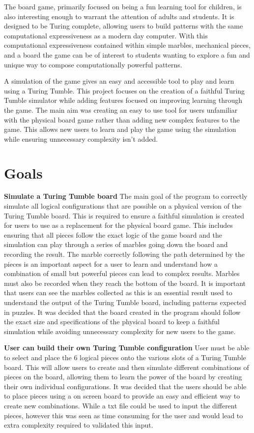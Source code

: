\documentclass{l4proj}
\begin{document}
The board game, primarily focused on being a fun learning tool for children, is also interesting enough to warrant the attention of adults and students. It is designed to be Turing complete, allowing users to build patterns with the same computational expressiveness as a modern day computer. With this computational expressiveness contained within simple marbles, mechanical pieces, and a board the game can be of interest to students wanting to explore a fun and unique way to compose computationally powerful patterns.  

A simulation of the game gives an easy and accessible tool to play and learn using a Turing Tumble. This project focuses on the creation of a faithful Turing Tumble simulator while adding features focused on improving learning through the game. The main aim was creating an easy to use tool for users unfamiliar with the physical board game rather than adding new complex features to the game. This allows new users to learn and play the game using the simulation while ensuring unnecessary complexity isn't added. 


\section{Goals}
\textbf{Simulate a Turing Tumble board} The main goal of the program to correctly simulate all logical configurations that are possible on a physical version of the Turing Tumble board. This is required to ensure a faithful simulation is created for users to use as a replacement for the physical board game. This includes ensuring that all pieces follow the exact logic of the game board and the simulation can play through a series of marbles going down the board and recording the result. The marble correctly following the path determined by the pieces is an important aspect for a user to learn and understand how a combination of small but powerful pieces can lead to complex results. Marbles must also be recorded when they reach the bottom of the board. It is important that users can see the marbles collected as this is an essential result used to understand the output of the Turing Tumble board, including patterns expected in puzzles. It was decided that the board created in the program should follow the exact size and specifications of the physical board to keep a faithful simulation while avoiding unnecessary complexity for new users to the game.

\textbf{User can build their own Turing Tumble configuration} User must be able to select and place the 6 logical pieces onto the various slots of a Turing Tumble board. This will allow users to create and then simulate different combinations of pieces on the board, allowing them to learn the power of the board by creating their own individual configurations. It was decided that the users should be able to place pieces using a on screen board to provide an easy and efficient way to create new combinations. While a txt file could be used to input the different pieces, however this was seen as time consuming for the user and would lead to extra complexity required to validated this input. 
\end{document}
